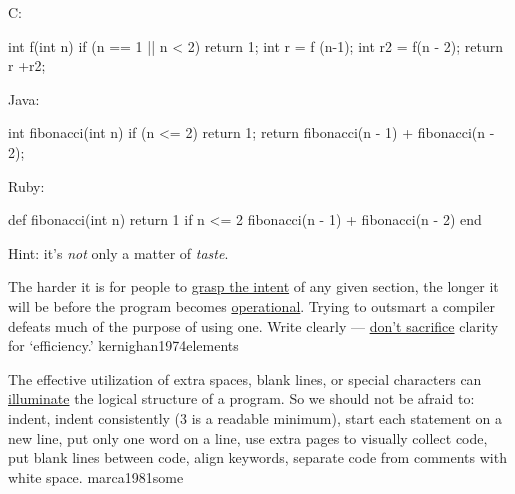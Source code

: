 \documentclass{article}
\begin{document}


\begin{pptWide}{3}
C:\par
{\small\begin{ffcode}
int f(int n)
{
  if (n == 1 || n < 2)
    return 1;
  int r = f (n-1);
  int r2 = f(n - 2);
  return r +r2;
  }
\end{ffcode}
}
\par\columnbreak\par
Java:\par
{\small\begin{ffcode}
int fibonacci(int n) {
  if (n <= 2) {
    return 1;
  }
  return fibonacci(n - 1)
    + fibonacci(n - 2);
}
\end{ffcode}
}
\par\columnbreak\par
Ruby:\par
{\small\begin{ffcode}
def fibonacci(int n)
  return 1 if n <= 2
  fibonacci(n - 1)
    + fibonacci(n - 2)
end
\end{ffcode}
}
\end{pptWide}
{\small Hint: it's \emph{not} only a matter of \emph{taste}.\par}
\plush{}


  {The harder it is for people to \ul{grasp the intent} of any given section, the longer it will be before the program becomes \ul{operational}. Trying to outsmart a compiler defeats much of the purpose of using one. Write clearly --- \ul{don't sacrifice} clarity for `efficiency.'}
  {kernighan1974elements}

  {The effective utilization of extra spaces, blank lines, or special characters can \ul{illuminate} the logical structure of a program. So we should not be afraid to: indent, indent consistently (3 is a readable minimum), start each statement on a new line, put only one word on a line, use extra pages to visually collect code, put blank lines between code, align keywords, separate code from comments with white space.}
  {marca1981some}
\end{document}
